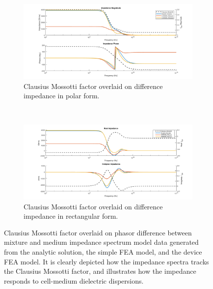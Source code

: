 \begin{figure}[t!]
    \centering
    \begin{subfigure}[b]{\textwidth}
        \centering
        \includegraphics[width=\textwidth]{images/IS_model_difference_mag_phase_CM_overlay.png}
        \caption{Clausius Mossotti factor overlaid on difference impedance in polar form.}
        \label{fig:IS_model_difference_fcm_overlay_a}
    \end{subfigure}
    \\
    \vspace{0.1 in}
    \begin{subfigure}[b]{\textwidth}
        \centering
        \includegraphics[width=\textwidth]{images/IS_model_real_imag_difference_CM_overlay.png}
        \caption{Clausius Mossotti factor overlaid on difference impedance in rectangular form.}
    \end{subfigure}

    \caption[Clausius Mossotti factor overlaid on IS model data.]{Clausius Mossotti factor overlaid on phasor difference between mixture and medium impedance spectrum model data generated from the analytic solution, the simple FEA model, and the device FEA model. It is clearly depicted how the impedance spectra tracks the Clausius Mossotti factor, and illustrates how the impedance responds to cell-medium dielectric dispersions.}
    \label{fig:IS_model_difference_fcm_overlay}
\end{figure}


